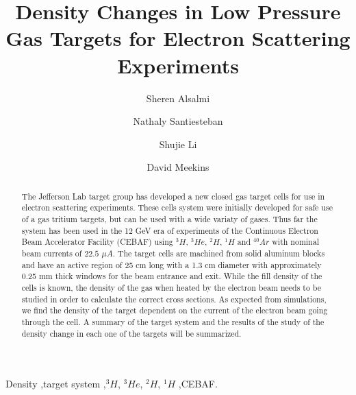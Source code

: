\documentclass[final,5p,times,twocolumn]{elsarticle}
\begin{document}
\begin{frontmatter}



\title{Density Changes in Low Pressure Gas Targets for Electron Scattering Experiments}

\author[Kent]{Sheren Alsalmi}
\author[UNH]{Nathaly Santiesteban}
\author[UNH]{Shujie Li}
\author[JLab]{David Meekins}

\address[Kent]{Kent State University}
\address[UNH]{University of New Hampshire}
\address[JLab]{Jefferson Lab}

\begin{abstract}

The Jefferson Lab target group has developed a new closed gas target cells for use in electron scattering experiments.  
These cells system were initially developed for
safe use of a gas tritium targets, but can be used with a wide variaty of gases.  Thus far the system has been used in the 12 GeV 
era of experiments of the Continuous Electron Beam Accelerator Facility (CEBAF) 
using $^{3}H$, $^{3}He$, $^{2}H$, $^{1}H$ and $^{40}Ar$ with nominal beam currents of 
$22.5$ $\mu A$.  The target cells are machined from solid  aluminum blocks and have an active region of 25 cm long with a 1.3 cm diameter 
with approximately 0.25 mm thick windows for the beam entrance and exit.   While the fill density of the cells is known, the density of the 
gas when heated by the electron beam needs to be studied in 
order to calculate the correct cross sections.  As expected from simulations, we find the density of the target dependent on the current 
of the electron beam going through the cell. A summary of the target system and the results of the study of the density change 
in each one of the targets will be summarized.

\end{abstract}

\begin{keyword}
Density \sep target system
\sep $^{3}H$, $^{3}He$, $^{2}H$, $^{1}H$
\sep CEBAF.
\end{keyword}
\end{frontmatter}
\end{document}
